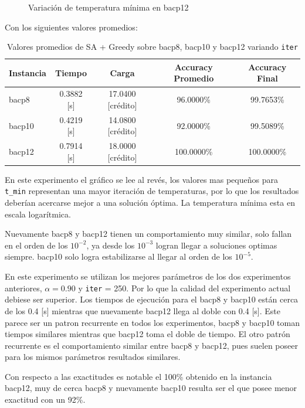 \documentclass[letterpaper,10pt]{article}
\begin{document}
\begin{figure}[H]
        \caption{Variación de temperatura mínima en bacp12}
        \label{fig:tmin3}
    \endminipage
\end{figure}

Con los siguientes valores promedios:

\begin{table}[H]
  \centering
  \begin{tabular}{@{}lcccc@{}}
    \toprule[1pt]
    Instancia & Tiempo & Carga & Accuracy Promedio & Accuracy Final \\
    \midrule
     bacp8 &  0.3882 [s] & 17.0400 [crédito] &   96.0000\% &  99.7653\% \\
    bacp10 &  0.4219 [s] & 14.0800 [crédito] &   92.0000\% &  99.5089\% \\
    bacp12 &  0.7914 [s] & 18.0000 [crédito] &  100.0000\% & 100.0000\% \\
    \bottomrule
  \end{tabular}
  \caption{Valores promedios de SA + Greedy sobre bacp8, bacp10 y bacp12 variando \texttt{iter}}
\end{table}

En este experimento el gráfico se lee al revés, los valores mas pequeños para \texttt{t\_min} representan una mayor iteración de temperaturas, por lo que los resultados deberían acercarse mejor a una solución óptima. La temperatura mínima esta en escala logarítmica.

Nuevamente bacp8 y bacp12 tienen un comportamiento muy similar, solo fallan en el orden de los $10^{-2}$, ya desde los $10^{-3}$ logran llegar a soluciones optimas siempre. bacp10 solo logra estabilizarse al llegar al orden de los $10^{-5}$.

En este experimento se utilizan los mejores parámetros de los dos experimentos anteriores, $\alpha = 0.90$ y \texttt{iter} = 250. Por lo que la calidad del experimento actual debiese ser superior. Los tiempos de ejecución para el bacp8 y bacp10 están cerca de los 0.4 [s] mientras que nuevamente bacp12 llega al doble con 0.4 [s]. Este parece ser un patron recurrente en todos los experimentos, bacp8 y bacp10 toman tiempos similares mientras que bacp12 toma el doble de tiempo. El otro patrón recurrente es el comportamiento similar entre bacp8 y bacp12, pues suelen poseer para los mismos parámetros resultados similares.

Con respecto a las exactitudes es notable el 100\% obtenido en la instancia bacp12, muy de cerca bacp8 y nuevamente bacp10 resulta ser el que posee menor exactitud con un 92\%.
\end{document}
